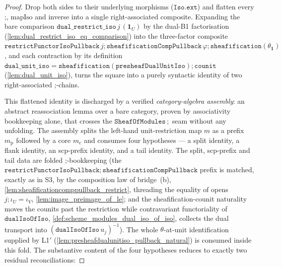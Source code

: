 \begin{proof}
  \leanok
  Drop both sides to their underlying morphisms (\(\mathtt{Iso.ext}\)) and flatten every
  \(\mathbin{;}\), \(\mathrm{mapIso}\) and inverse into a single right-associated composite. Expanding
  the bare comparison \(\mathtt{dual\_restrict\_iso}\,j\,(\mathbf 1_U)\) by the dual-B1 factorisation
  (\cref{lem:dual_restrict_iso_eq_comparison}) into the three-factor composite
  \(\mathtt{restrictFunctorIsoPullback}\,j \mathbin{;} \mathtt{sheafificationCompPullback}\,\varphi
  \mathbin{;} \mathtt{sheafification}(\theta_{\mathbf 1})\), and each contraction by its definition
  \(\mathtt{dual\_unit\_iso} = \mathtt{sheafification}(\mathtt{presheafDualUnitIso}) \mathbin{;}
  \mathtt{counit}\) (\cref{lem:dual_unit_iso}), turns the square into a purely syntactic identity of
  two right-associated \(\mathbin{;}\)-chains.

  This flattened identity is discharged by a verified \emph{category-algebra assembly}: an abstract
  reassociation lemma over a bare category, proven by associativity bookkeeping alone, that crosses
  the \(\mathtt{SheafOfModules}\,\mathbin{;}\) seam without any unfolding. The assembly splits the
  left-hand unit-restriction map \(m\) as a prefix \(m_{\mathrm p}\) followed by a core
  \(m_{\mathrm c}\) and consumes four hypotheses --- a split identity, a flank identity, an
  scp-prefix identity, and a tail identity. The split, scp-prefix and tail data are folded
  \(\mathbin{;}\)-bookkeeping (the \(\mathtt{restrictFunctorIsoPullback} \mathbin{;}
  \mathtt{sheafificationCompPullback}\) prefix is matched, exactly as in S3, by the composition law of
  bridge~(b), \cref{lem:sheafificationcomppullback_restrict}, threading the equality of opens
  \(j \mathbin{;} \iota_U = \iota_V\), \cref{lem:image_preimage_of_le}; and the
  sheafification-counit naturality moves the counits past the restriction while contravariant
  functoriality of \(\mathtt{dualIsoOfIso}\), \cref{def:scheme_modules_dual_iso_of_iso}, collects the
  dual transport into \((\mathtt{dualIsoOfIso}\,u_j)^{-1}\)). The whole \(\theta\)-at-unit
  identification supplied by L1$'$ (\cref{lem:presheafdualunitiso_pullback_natural}) is consumed
  inside this fold. The substantive content of the four hypotheses reduces to exactly two residual
  reconciliations:


\end{proof}
